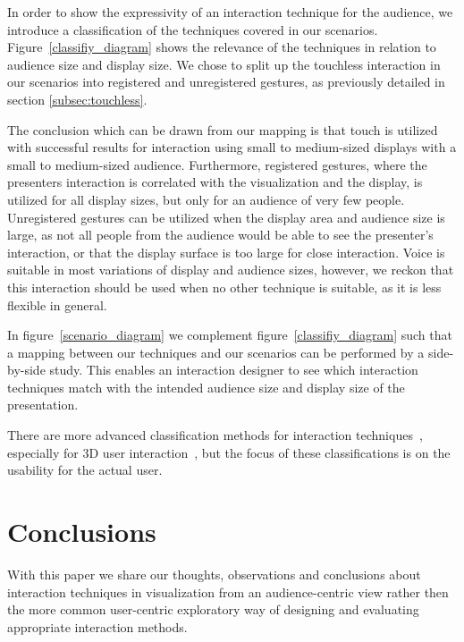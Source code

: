 \documentclass[review,journal]{vgtc}         %
\begin{document}
In order to show the expressivity of an interaction technique for the audience, we introduce a classification of the techniques covered in our scenarios.
Figure~\ref{classifiy_diagram} shows the relevance of the techniques in relation to audience size and display size. 
We chose to split up the touchless interaction in our scenarios into registered and unregistered gestures, as previously detailed in section \ref{subsec:touchless}.

The conclusion which can be drawn from our mapping is that touch is utilized with successful results for interaction using small to medium-sized displays with a small to medium-sized audience. 
Furthermore, registered gestures, where the presenters interaction is correlated with the visualization and the display, is utilized for all display sizes, but only for an audience of very few people.
Unregistered gestures can be utilized when the display area and audience size is large, as not all people from the audience would be able to see the presenter's interaction, or that the display surface is too large for close interaction.
Voice is suitable in most variations of display and audience sizes, however, we reckon that this interaction should be used when no other technique is suitable, as it is less flexible in general.

In figure~\ref{scenario_diagram} we complement figure~\ref{classifiy_diagram} such that a mapping between our techniques and our scenarios can be performed by a side-by-side study.
This enables an interaction designer to see which interaction techniques match with the intended audience size and display size of the presentation.

There are more advanced classification methods for interaction techniques~\cite{stars:65-93:2012}, especially for 3D user interaction~\cite{CGF:CGF194, Kettner95aclassification, 978-3-319-07458-0_1}, but the focus of these classifications is on the usability for the actual user.

\section{Conclusions}\label{sec:conclusion}

With this paper we share our thoughts, observations and conclusions about interaction techniques in visualization from an audience-centric view rather then the more common user-centric exploratory way of designing and evaluating appropriate interaction methods.
\end{document}
